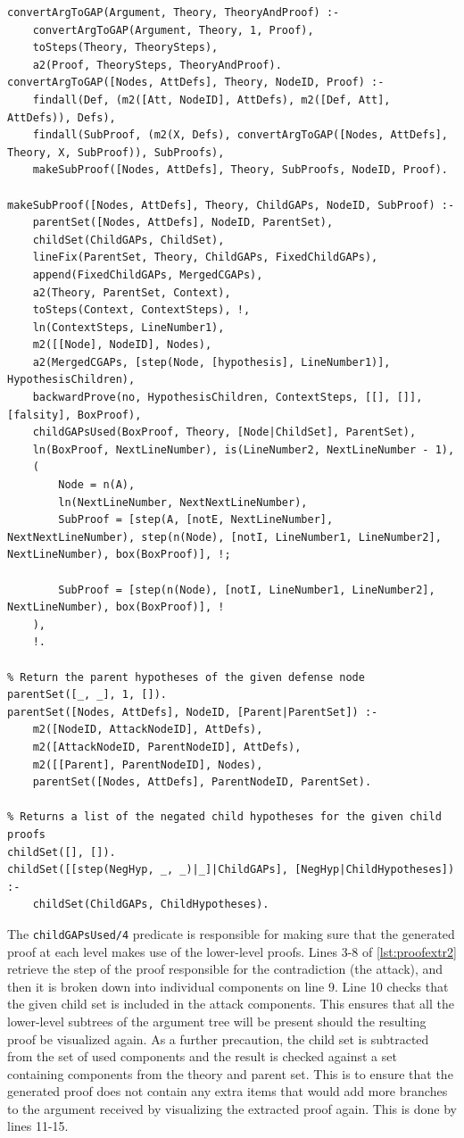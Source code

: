 \documentclass[11pt,twoside,a4paper]{report}
\begin{document}
\begin{lstlisting}[caption={First part of the proof extraction algorithm},label=lst:proofextr1]
convertArgToGAP(Argument, Theory, TheoryAndProof) :-
	convertArgToGAP(Argument, Theory, 1, Proof),
	toSteps(Theory, TheorySteps),
	a2(Proof, TheorySteps, TheoryAndProof).
convertArgToGAP([Nodes, AttDefs], Theory, NodeID, Proof) :-
	findall(Def, (m2([Att, NodeID], AttDefs), m2([Def, Att], AttDefs)), Defs),
	findall(SubProof, (m2(X, Defs), convertArgToGAP([Nodes, AttDefs], Theory, X, SubProof)), SubProofs),
	makeSubProof([Nodes, AttDefs], Theory, SubProofs, NodeID, Proof).

makeSubProof([Nodes, AttDefs], Theory, ChildGAPs, NodeID, SubProof) :-
	parentSet([Nodes, AttDefs], NodeID, ParentSet),
	childSet(ChildGAPs, ChildSet),
	lineFix(ParentSet, Theory, ChildGAPs, FixedChildGAPs),
	append(FixedChildGAPs, MergedCGAPs),
	a2(Theory, ParentSet, Context),
	toSteps(Context, ContextSteps), !,
	ln(ContextSteps, LineNumber1),
	m2([[Node], NodeID], Nodes),
	a2(MergedCGAPs, [step(Node, [hypothesis], LineNumber1)], HypothesisChildren),
	backwardProve(no, HypothesisChildren, ContextSteps, [[], []], [falsity], BoxProof),
	childGAPsUsed(BoxProof, Theory, [Node|ChildSet], ParentSet),
	ln(BoxProof, NextLineNumber), is(LineNumber2, NextLineNumber - 1),
	(
		Node = n(A),
		ln(NextLineNumber, NextNextLineNumber),
		SubProof = [step(A, [notE, NextLineNumber], NextNextLineNumber), step(n(Node), [notI, LineNumber1, LineNumber2], NextLineNumber), box(BoxProof)], !;

		SubProof = [step(n(Node), [notI, LineNumber1, LineNumber2], NextLineNumber), box(BoxProof)], !
	),
	!.
	
% Return the parent hypotheses of the given defense node
parentSet([_, _], 1, []).
parentSet([Nodes, AttDefs], NodeID, [Parent|ParentSet]) :-
	m2([NodeID, AttackNodeID], AttDefs),
	m2([AttackNodeID, ParentNodeID], AttDefs),
	m2([[Parent], ParentNodeID], Nodes),
	parentSet([Nodes, AttDefs], ParentNodeID, ParentSet).

% Returns a list of the negated child hypotheses for the given child proofs
childSet([], []).
childSet([[step(NegHyp, _, _)|_]|ChildGAPs], [NegHyp|ChildHypotheses]) :-
	childSet(ChildGAPs, ChildHypotheses).
\end{lstlisting}

The \lstinline$childGAPsUsed/4$ predicate is responsible for making sure that the generated proof at each level makes use of the lower-level proofs. Lines 3-8 of \autoref{lst:proofextr2} retrieve the step of the proof responsible for the contradiction (the attack), and then it is broken down into individual components on line 9. Line 10 checks that the given child set is included in the attack components. This ensures that all the lower-level subtrees of the argument tree will be present should the resulting proof be visualized again. As a further precaution, the child set is subtracted from the set of used components and the result is checked against a set containing components from the theory and parent set. This is to ensure that the generated proof does not contain any extra items that would add more branches to the argument received by visualizing the extracted proof again. This is done by lines 11-15.
\end{document}
